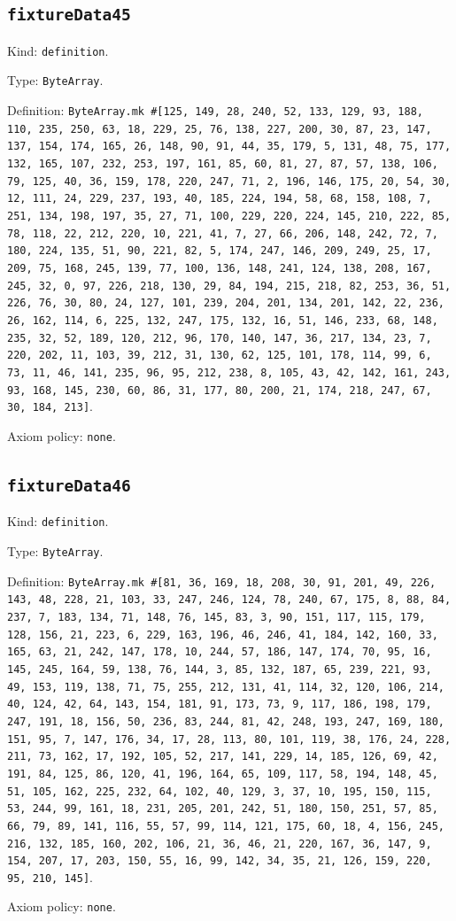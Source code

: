 \documentclass[11pt]{article}
\begin{document}
\subsection*{\texttt{fixtureData45}}
\noindent Kind: \texttt{definition}.\par
\noindent Type: \texttt{ByteArray}.\par
\noindent Definition: \texttt{ByteArray.mk \#[125, 149, 28, 240, 52, 133, 129, 93, 188, 110, 235, 250, 63, 18, 229, 25, 76, 138, 227, 200, 30, 87, 23, 147, 137, 154, 174, 165, 26, 148, 90, 91, 44, 35, 179, 5, 131, 48, 75, 177, 132, 165, 107, 232, 253, 197, 161, 85, 60, 81, 27, 87, 57, 138, 106, 79, 125, 40, 36, 159, 178, 220, 247, 71, 2, 196, 146, 175, 20, 54, 30, 12, 111, 24, 229, 237, 193, 40, 185, 224, 194, 58, 68, 158, 108, 7, 251, 134, 198, 197, 35, 27, 71, 100, 229, 220, 224, 145, 210, 222, 85, 78, 118, 22, 212, 220, 10, 221, 41, 7, 27, 66, 206, 148, 242, 72, 7, 180, 224, 135, 51, 90, 221, 82, 5, 174, 247, 146, 209, 249, 25, 17, 209, 75, 168, 245, 139, 77, 100, 136, 148, 241, 124, 138, 208, 167, 245, 32, 0, 97, 226, 218, 130, 29, 84, 194, 215, 218, 82, 253, 36, 51, 226, 76, 30, 80, 24, 127, 101, 239, 204, 201, 134, 201, 142, 22, 236, 26, 162, 114, 6, 225, 132, 247, 175, 132, 16, 51, 146, 233, 68, 148, 235, 32, 52, 189, 120, 212, 96, 170, 140, 147, 36, 217, 134, 23, 7, 220, 202, 11, 103, 39, 212, 31, 130, 62, 125, 101, 178, 114, 99, 6, 73, 11, 46, 141, 235, 96, 95, 212, 238, 8, 105, 43, 42, 142, 161, 243, 93, 168, 145, 230, 60, 86, 31, 177, 80, 200, 21, 174, 218, 247, 67, 30, 184, 213]}.\par
\noindent Axiom policy: \texttt{none}.\par
\subsection*{\texttt{fixtureData46}}
\noindent Kind: \texttt{definition}.\par
\noindent Type: \texttt{ByteArray}.\par
\noindent Definition: \texttt{ByteArray.mk \#[81, 36, 169, 18, 208, 30, 91, 201, 49, 226, 143, 48, 228, 21, 103, 33, 247, 246, 124, 78, 240, 67, 175, 8, 88, 84, 237, 7, 183, 134, 71, 148, 76, 145, 83, 3, 90, 151, 117, 115, 179, 128, 156, 21, 223, 6, 229, 163, 196, 46, 246, 41, 184, 142, 160, 33, 165, 63, 21, 242, 147, 178, 10, 244, 57, 186, 147, 174, 70, 95, 16, 145, 245, 164, 59, 138, 76, 144, 3, 85, 132, 187, 65, 239, 221, 93, 49, 153, 119, 138, 71, 75, 255, 212, 131, 41, 114, 32, 120, 106, 214, 40, 124, 42, 64, 143, 154, 181, 91, 173, 73, 9, 117, 186, 198, 179, 247, 191, 18, 156, 50, 236, 83, 244, 81, 42, 248, 193, 247, 169, 180, 151, 95, 7, 147, 176, 34, 17, 28, 113, 80, 101, 119, 38, 176, 24, 228, 211, 73, 162, 17, 192, 105, 52, 217, 141, 229, 14, 185, 126, 69, 42, 191, 84, 125, 86, 120, 41, 196, 164, 65, 109, 117, 58, 194, 148, 45, 51, 105, 162, 225, 232, 64, 102, 40, 129, 3, 37, 10, 195, 150, 115, 53, 244, 99, 161, 18, 231, 205, 201, 242, 51, 180, 150, 251, 57, 85, 66, 79, 89, 141, 116, 55, 57, 99, 114, 121, 175, 60, 18, 4, 156, 245, 216, 132, 185, 160, 202, 106, 21, 36, 46, 21, 220, 167, 36, 147, 9, 154, 207, 17, 203, 150, 55, 16, 99, 142, 34, 35, 21, 126, 159, 220, 95, 210, 145]}.\par
\noindent Axiom policy: \texttt{none}.\par
\end{document}

